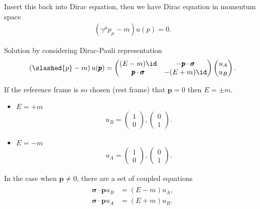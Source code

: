 Insert this back into Dirac equation, then we have Dirac equation in momentum space
\begin{align}
   \left( \gamma^\mu p_\mu - m \right) u({p}) = 0.
\end{align}

Solution by considering Dirac-Pauli representation
\begin{align*}
   \left( \slashed{p} - m \right) u(\pmb{p}) = \begin{pmatrix} (E-m) \id & - \pmb{p} \cdot \pmb{\sigma} \\ \pmb{p} \cdot \pmb{\sigma} & -(E+m) \id \end{pmatrix} 
   \begin{pmatrix} u_A \\ u_B\end{pmatrix}.
\end{align*}

If the reference frame is so chosen (rest frame) that $\pmb{p} = 0$ then $E = \pm m$.
\begin{itemize}
   \item $E = +m$  
      \begin{align*}
         u_B = \begin{pmatrix} 1 \\ 0 \end{pmatrix} , \begin{pmatrix} 0 \\ 1\end{pmatrix}.
      \end{align*}

   \item $E=-m$
      \begin{align*}
         u_A = \begin{pmatrix} 1 \\ 0\end{pmatrix}, \begin{pmatrix} 0 \\ 1\end{pmatrix}.
      \end{align*}
\end{itemize}

In the case when $\pmb{p} \neq 0$, there are a set of coupled equations
\begin{align}
   \begin{split}
    \pmb{\sigma} \cdot \pmb{p} u_B &= (E-m) u_A, \\
   \pmb{\sigma} \cdot \pmb{p} u_A &= (E+m) u_B.
   \end{split}
\end{align}

